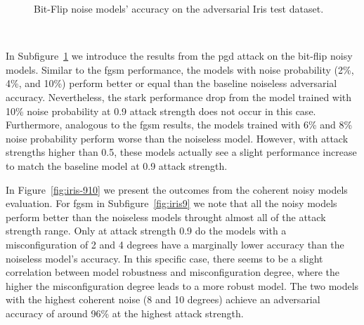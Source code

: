 \begin{figure}[!h]
\begin{subfigure}{0.45\textwidth}
      \label{fig:iris8}
  \end{subfigure}
  \caption{Bit-Flip noise models' accuracy on the adversarial Iris test dataset.}
  \label{fig:iris-78}
\end{figure} \

In Subfigure~\ref{fig:iris8} we introduce the results from the \ac{pgd}
attack on the bit-flip noisy models. Similar to the \ac{fgsm} performance,
the models with noise probability (2\%, 4\%, and 10\%) perform better or equal
than the baseline noiseless adversarial accuracy. Nevertheless, the stark
performance drop from the model trained with 10\% noise probability
at 0.9 attack strength does not occur in this case. Furthermore, analogous
to the \ac{fgsm} results, the models trained with 6\% and 8\% noise
probability perform worse than the noiseless model. However, with attack
strengths higher than 0.5, these models actually see a slight performance
increase to match the baseline model at 0.9 attack strength. \

In Figure~\ref{fig:iris-910} we present the outcomes from the coherent
noisy models evaluation. For \ac{fgsm} in Subfigure~\ref{fig:iris9}
we note that all the noisy models perform better than the noiseless
models throught almost all of the attack strength range. Only at 
attack strength 0.9 do the models with a misconfiguration of 2 and
4 degrees have a marginally lower accuracy than the noiseless model's
accuracy. In this specific case, there seems to be a slight correlation
between model robustness and misconfiguration degree, where the
higher the misconfiguration degree leads to a more robust model. The
two models with the highest coherent noise (8 and 10 degrees) achieve
an adversarial accuracy of around 96\% at the highest attack strength. \

